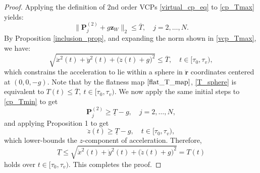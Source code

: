 \documentclass[journal,10pt]{IEEEtran}
\newtheorem{lemma}{\bfseries Lemma}%
\newcommand{\vect}[1]{\boldsymbol{\mathbf{#1}}}
\newif\ifdraft
\newcommand{\XX}[1]{\ifdraft{\color{red}[{\bf XX}: #1]}\fi}
\newcommand{\VF}[1]{\ifdraft{\color{blue}[{\bf VF}: #1]}\fi}
\begin{document}

\begin{proof}
Applying the definition of $2$nd order VCPs \eqref{virtual_cp_eq} to \eqref{cp_Tmax} yields:
\begin{equation} \label{vcp_Tmax}
    \|\vect{P}_j^{(2)}+g\vect{z}_W\|_2\leq \overline{T}, \quad j = 2,\dots,N.
\end{equation}
By Proposition \ref{inclusion_prop}, and expanding the norm shown in \eqref{vcp_Tmax}, we have:
\begin{equation} \label{T_sphere}
    \sqrt{\ddot{x}^2(t) + \ddot{y}^2(t)+\big(\ddot{z}(t)+g\big)^2}\leq \overline{T}, \quad t\in[\tau_0,\tau_v),
\end{equation}
which constrains the acceleration to lie within a sphere in $\ddot{\vect{r}}$ coordinates centered at $(0,0,-g)$. Note that by the flatness map $\eqref{flat_T_map}$, \eqref{T_sphere} is equivalent to $T(t)\leq \overline{T},\ t\in[\tau_0,\tau_v)$. We now apply the same initial steps to \eqref{cp_Tmin} to get
\begin{equation}\label{vcp_Tmin}
    \vect{P}_j^{(2)}\geq \underline{T}-g, \quad j=2,\ldots,N,
\end{equation}
and applying Proposition 1 to get
\begin{equation}
    \ddot{z}(t)\geq \underline{T}-g, \quad t\in[\tau_0,\tau_v),
\end{equation}
which lower-bounds the $z$-component of acceleration. Therefore,
\begin{equation}
    \underline{T}\leq \sqrt{\ddot{x}^2(t) + \ddot{y}^2(t)+\big(\ddot{z}(t)+g\big)^2}=T(t)
\end{equation}
holds over $t\in[\tau_0,\tau_v)$. This completes the proof.
\end{proof}
\end{document}
